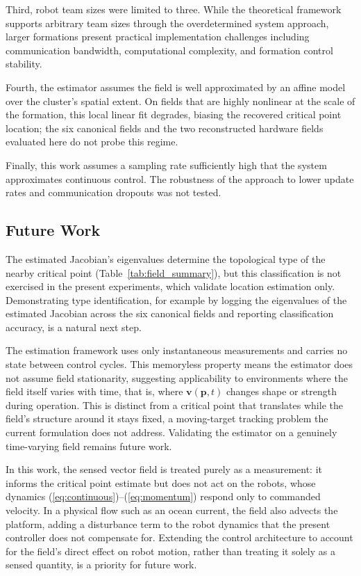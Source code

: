 \documentclass[lettersize,journal]{IEEEtran}
\begin{document}
Third, robot team sizes were limited to three. While the theoretical framework supports arbitrary team sizes through the overdetermined system approach, larger formations present practical implementation challenges including communication bandwidth, computational complexity, and formation control stability.

Fourth, the estimator assumes the field is well approximated by an affine model over the cluster's spatial extent. On fields that are highly nonlinear at the scale of the formation, this local linear fit degrades, biasing the recovered critical point location; the six canonical fields and the two reconstructed hardware fields evaluated here do not probe this regime.

Finally, this work assumes a sampling rate sufficiently high that the system approximates continuous control. The robustness of the approach to lower update rates and communication dropouts was not tested.

\subsection{Future Work}

The estimated Jacobian's eigenvalues determine the topological type of the nearby critical point (Table~\ref{tab:field_summary}), but this classification is not exercised in the present experiments, which validate location estimation only. Demonstrating type identification, for example by logging the eigenvalues of the estimated Jacobian across the six canonical fields and reporting classification accuracy, is a natural next step.

The estimation framework uses only instantaneous measurements and carries no state between control cycles. This memoryless property means the estimator does not assume field stationarity, suggesting applicability to environments where the field itself varies with time, that is, where $\mathbf{v}(\mathbf{p}, t)$ changes shape or strength during operation. This is distinct from a critical point that translates while the field's structure around it stays fixed, a moving-target tracking problem the current formulation does not address. Validating the estimator on a genuinely time-varying field remains future work.

In this work, the sensed vector field is treated purely as a measurement: it informs the critical point estimate but does not act on the robots, whose dynamics (\ref{eq:continuous})--(\ref{eq:momentum}) respond only to commanded velocity. In a physical flow such as an ocean current, the field also advects the platform, adding a disturbance term to the robot dynamics that the present controller does not compensate for. Extending the control architecture to account for the field's direct effect on robot motion, rather than treating it solely as a sensed quantity, is a priority for future work.
\end{document}

